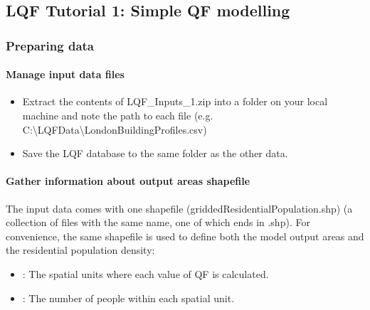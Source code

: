 \documentclass[letterpaper,10pt,english]{sphinxmanual}
\begin{document}
\subsection{LQF Tutorial 1: Simple QF modelling}
\label{\detokenize{Tutorials/LQF:lqf-tutorial-1-simple-qf-modelling}}

\subsubsection{Preparing data}
\label{\detokenize{Tutorials/LQF:preparing-data}}

\paragraph{Manage input data files}
\label{\detokenize{Tutorials/LQF:manage-input-data-files}}\begin{itemize}
\item {} 
Extract the contents of LQF\_Inputs\_1.zip into a folder on your
local machine and note the path to each file (e.g.
C:\textbackslash{}LQFData\textbackslash{}LondonBuildingProfiles.csv)

\item {} 
Save the LQF database to the same folder as the other data.

\end{itemize}


\paragraph{Gather information about output areas shapefile}
\label{\detokenize{Tutorials/LQF:gather-information-about-output-areas-shapefile}}
The input data comes with one shapefile
(griddedResidentialPopulation.shp) (a collection of files with the same
name, one of which ends in .shp). For convenience, the same shapefile is
used to define both the model output areas and the residential
population density:
\begin{itemize}
\item {} 
: The spatial units where each value of QF is
calculated.

\item {} 
: The number of people within each spatial
unit.

\end{itemize}
\end{document}

